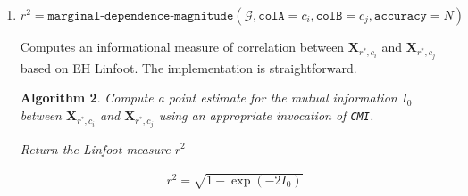 \documentclass[10pt,letterpaper]{article}
\newtheorem{algorithm}{Algorithm}[section]
\newcommand{\set}[1]{\{#1\}}
\begin{document}
\begin{enumerate}
    Computes the probability, under the random latent structure of the GPM,
    that the two variables $\mathbf{X}_{r^*,c_i}$ and $\mathbf{X}_{r^*,c_j}$ are
    unconditionally independent.

    \begin{align*}
    \mathbb{P}_\mathcal{G}\set{I(\mathbf{X}_{r^*,c_i} : \mathbf{X}_{r^*,c_j} = 0)}
    \end{align*}

    Given that mutual information is zero if and only the two variables are
    statistically independent, the following simple Monte Carlo procedure is a
    suggested implementation.

    \begin{algorithm} \label{alg:marginal_depprob} First obtain a set of mutual
        information estimates by invoking {\tt CMI}

        \begin{align*}
        \set{I_k} = {\tt CMI}(
        \mathcal{G},
        A = \set{(r_i^*,c_i)}, B = \set{(r_i^*,c_j)}, C = \emptyset, D =
        \emptyset,\\ {\tt accuracy} = N, {\tt size} = N)
        \end{align*}

        Return the fraction of samples from $\set{I_k}$ for which the mutual
        information is zero
        \begin{align*}
            p = \frac{1}{|\set{I_k}|}\sum_{k}{\mathbb{I}_{\set{0}}(I_k)}
        \end{align*}
    \end{algorithm}

\item $r^2 = \texttt{marginal-dependence-magnitude}(\mathcal{G},
    \texttt{colA}=c_i,
    \texttt{colB}=c_j,
    \texttt{accuracy}=N)$

    Computes an informational measure of correlation between
    $\mathbf{X}_{r^*,c_i}$ and $\mathbf{X}_{r^*,c_j}$ based on EH Linfoot. The
    implementation is straightforward.

    \begin{algorithm} \label{alg:linfoot} Compute a point estimate for the
        mutual information $I_0$ between $\mathbf{X}_{r^*,c_i}$ and
        $\mathbf{X}_{r^*,c_j}$ using an appropriate invocation of {\tt CMI}.

        Return the Linfoot measure $r^2$

        \begin{align*}
        r^2 = \sqrt{1 - \exp{(-2I_0)}}
        \end{align*}


\end{algorithm}
\end{enumerate}
\end{document}
